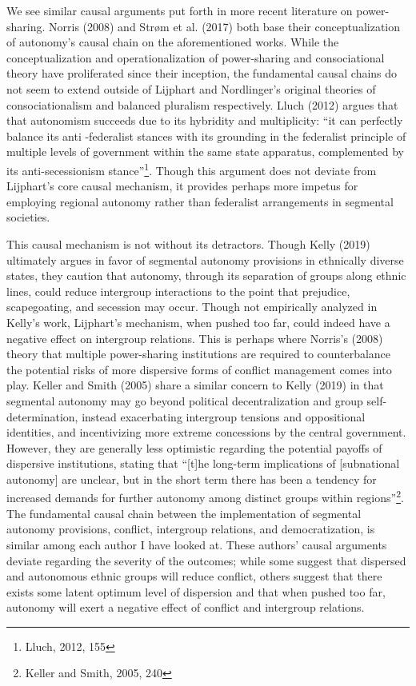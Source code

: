 \documentclass[12pt]{article}
\begin{document}
We see similar causal arguments put forth in more recent literature on power-sharing. Norris (2008) and Strøm et al. (2017) both base their conceptualization of autonomy’s causal chain on the aforementioned works. While the conceptualization and operationalization of power-sharing and consociational theory have proliferated since their inception, the fundamental causal chains do not seem to extend outside of Lijphart and Nordlinger’s original theories of consociationalism and balanced pluralism respectively. Lluch (2012) argues that that autonomism succeeds due to its hybridity and multiplicity: “it can perfectly balance its anti -federalist stances with its grounding in the federalist principle of multiple levels of government within the same state apparatus, complemented by its anti-secessionism stance”\footnote{Lluch, 2012, 155}. Though this argument does not deviate from Lijphart’s core causal mechanism, it provides perhaps more impetus for employing regional autonomy rather than federalist arrangements in segmental societies. 

This causal mechanism is not without its detractors. Though Kelly (2019) ultimately argues in favor of segmental autonomy provisions in ethnically diverse states, they caution that autonomy, through its separation of groups along ethnic lines, could reduce intergroup interactions to the point that prejudice, scapegoating, and secession may occur. Though not empirically analyzed in Kelly’s work, Lijphart’s mechanism, when pushed too far, could indeed have a negative effect on intergroup relations. This is perhaps where Norris’s (2008) theory that multiple power-sharing institutions are required to counterbalance the potential risks of more dispersive forms of conflict management comes into play. Keller and Smith (2005) share a similar concern to Kelly (2019) in that segmental autonomy may go beyond political decentralization and group self-determination, instead exacerbating intergroup tensions and oppositional identities, and incentivizing more extreme concessions by the central government. However, they are generally less optimistic regarding the potential payoffs of dispersive institutions, stating that “[t]he long-term implications of [subnational autonomy] are unclear, but in the short term there has been a tendency for increased demands for further autonomy among distinct groups within regions”\footnote{Keller and Smith, 2005, 240}. The fundamental causal chain between the implementation of segmental autonomy provisions, conflict, intergroup relations, and democratization, is similar among each author I have looked at. These authors’ causal arguments deviate regarding the severity of the outcomes; while some suggest that dispersed and autonomous ethnic groups will reduce conflict, others suggest that there exists some latent optimum level of dispersion and that when pushed too far, autonomy will exert a negative effect of conflict and intergroup relations.  
\end{document}
